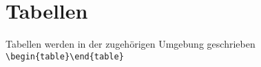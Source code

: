 \chapter{Tabellen}

Tabellen werden in der zugehörigen Umgebung geschrieben \verb|\begin{table}\end{table}|

